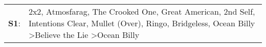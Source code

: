 \begin{supertabular}{p{0.03\textwidth}p{0.92\textwidth}}
 \textbf{S1}:  &  2x2\textsuperscript{}, \enspace Atmosfarag\textsuperscript{}, \enspace The Crooked One\textsuperscript{}, \enspace Great American\textsuperscript{}, \enspace 2nd Self\textsuperscript{}, \enspace Intentions Clear\textsuperscript{}, \enspace Mullet (Over)\textsuperscript{}, \enspace Ringo\textsuperscript{}, \enspace Bridgeless\textsuperscript{}, \enspace Ocean Billy\textsuperscript{} \textgreater \enspace Believe the Lie\textsuperscript{} \textgreater \enspace Ocean Billy\textsuperscript{}  \enspace  \\
\end{supertabular}
